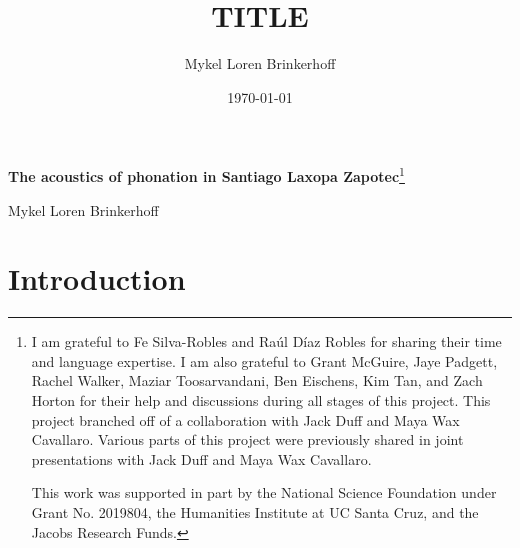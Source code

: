 \documentclass[12pt, letterpaper]{article}
\title{TITLE}
\author{Mykel Loren Brinkerhoff}
\date{\today}
\begin{document}


\begin{center}
    {\Large \textbf{The acoustics of phonation in Santiago Laxopa Zapotec}}\footnote{I am grateful to Fe Silva-Robles and  Raúl Díaz Robles for sharing their time and language expertise. I am also grateful to Grant McGuire,  Jaye Padgett, Rachel Walker, Maziar Toosarvandani, Ben Eischens, Kim Tan, and Zach Horton for their help and discussions during all stages of this project. This project branched off of a collaboration with Jack Duff and Maya Wax Cavallaro. Various parts of this project were previously shared in joint presentations with Jack Duff and Maya Wax Cavallaro.
	
	This work was supported in part by the National Science Foundation under Grant No. 2019804, the Humanities Institute at UC Santa Cruz, and the Jacobs Research Funds.}
    \vspace{6pt}

    Mykel Loren Brinkerhoff
\end{center}
\thispagestyle{fancy}


\section{Introduction} \label{sec:Introduction}
\end{document}
